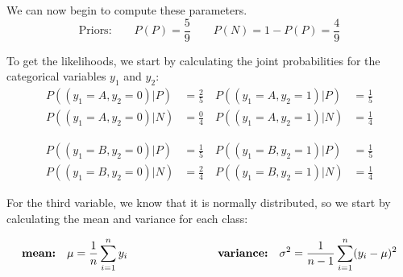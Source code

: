 \documentclass[12pt]{article}
\begin{document}
\begin{enumerate}[leftmargin=\labelsep]
    \vspace{10pt}
    We can now begin to compute these parameters.
    \vspace{10pt}
    \begin{equation*}
        \text{Priors:} \qquad
        P(P) = \frac{5}{9} \quad \quad P(N) = 1- P(P) = \frac{4}{9} 
    \end{equation*}

    \vspace{10pt}
    To get the likelihoods, we start by calculating the joint probabilities for the categorical variables $y_1$ and $y_2$:
    \begin{equation*}
        \begin{aligned}
        P((y_1 = A, y_2 = 0)|P) &= \frac{2}{5} \quad  P((y_1= A, y_2 = 1)|P) &= \frac{1}{5} 
        \\
        P((y_1 = A, y_2 = 0)|N) &= \frac{0}{4} \quad  P((y_1 = A, y_2= 1)|N) &= \frac{1}{4} 
        \end{aligned}
    \end{equation*}

    \begin{equation*}
        \begin{aligned}
        P((y_1 = B, y_2 = 0)|P) &= \frac{1}{5} \quad  P((y_1 = B, y_2 = 1)|P) &= \frac{1}{5} 
        \\
        P((y_1 = B, y_2 = 0)|N) &= \frac{2}{4} \quad  P((y_1 = B, y_2 = 1)|N) &= \frac{1}{4} 
        \end{aligned}
    \end{equation*}

    \vspace{10pt}
    For the third variable, we know that it is normally distributed, so we start by calculating the mean and variance for each class:

    \begin{equation*}
            \textbf{\text{mean:}} \quad \mu = \frac{1}{n} \sum_{i=1}^{n} y_i \qquad\qquad\qquad\qquad \textbf{\text{variance:}} \quad \sigma^2 = \frac{1}{n-1} \sum_{i=1}^{n} (y_i - \mu)^2
    \end{equation*}


\end{enumerate}
\end{document}
